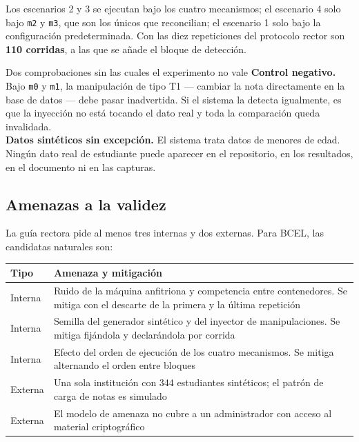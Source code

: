 \documentclass[11pt,a4paper]{article}
\begin{document}
Los escenarios 2 y 3 se ejecutan bajo los cuatro mecanismos; el escenario 4 solo bajo \texttt{m2} y \texttt{m3}, que son los únicos que reconcilian; el escenario 1 solo bajo la configuración predeterminada. Con las diez repeticiones del protocolo rector son \textbf{110 corridas}, a las que se añade el bloque de detección.

\begin{pisoBox}{Dos comprobaciones sin las cuales el experimento no vale}
	\textbf{Control negativo.} Bajo \texttt{m0} y \texttt{m1}, la manipulación de tipo T1 --- cambiar la nota directamente en la base de datos --- debe pasar inadvertida. Si el sistema la detecta igualmente, es que la inyección no está tocando el dato real y toda la comparación queda invalidada.\\[5pt]
	\textbf{Datos sintéticos sin excepción.} El sistema trata datos de menores de edad. Ningún dato real de estudiante puede aparecer en el repositorio, en los resultados, en el documento ni en las capturas.
\end{pisoBox}

\subsection{Amenazas a la validez}

La guía rectora pide al menos tres internas y dos externas. Para BCEL, las candidatas naturales son:

\begin{center}
	\small
	\begin{tabular}{@{}p{2.0cm}p{12.9cm}@{}}
		\toprule
		\textbf{Tipo} & \textbf{Amenaza y mitigación} \\
		\midrule
		Interna & Ruido de la máquina anfitriona y competencia entre contenedores. Se mitiga con el descarte de la primera y la última repetición \\
		Interna & Semilla del generador sintético y del inyector de manipulaciones. Se mitiga fijándola y declarándola por corrida \\
		Interna & Efecto del orden de ejecución de los cuatro mecanismos. Se mitiga alternando el orden entre bloques \\
		\addlinespace
		Externa & Una sola institución con 344 estudiantes sintéticos; el patrón de carga de notas es simulado \\
		Externa & El modelo de amenaza no cubre a un administrador con acceso al material criptográfico \\
		\bottomrule
	\end{tabular}
\end{center}
\end{document}
